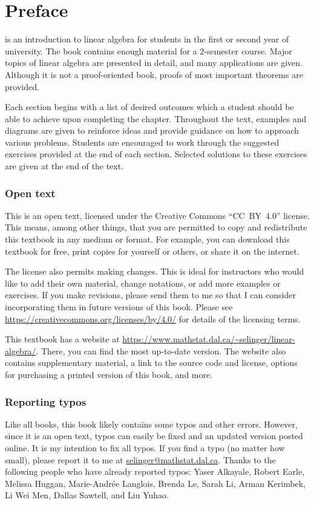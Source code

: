 \chapter*{Preface}

\textit{\bookfulltitle} is an introduction to linear algebra for
students in the first or second year of university. The book contains
enough material for a 2-semester course. Major topics of linear
algebra are presented in detail, and many applications are
given. Although it is not a proof-oriented book, proofs of most
important theorems are provided. 

Each section begins with a list of desired outcomes which a student
should be able to achieve upon completing the chapter.  Throughout the
text, examples and diagrams are given to reinforce ideas and provide
guidance on how to approach various problems. Students are encouraged
to work through the suggested exercises provided at the end of each
section. Selected solutions to these exercises are given at the end of
the text.

\subsection*{Open text}

This is an open text, licensed under the Creative Commons
``CC~BY~4.0'' license. This means, among other things, that you are
permitted to copy and redistribute this textbook in any medium or
format. For example, you can download this textbook for free, print
copies for yourself or others, or share it on the internet.

The license also permits making changes. This is ideal for instructors
who would like to add their own material, change notations, or add
more examples or exercises. If you make revisions, please send them to
me so that I can consider incorporating them in future versions of
this book. Please see
\url{https://creativecommons.org/licenses/by/4.0/} for details of the
licensing terms.

This textbook has a website at
\url{https://www.mathstat.dal.ca/~selinger/linear-algebra/}.  There,
you can find the most up-to-date version. The website also contains
supplementary material, a link to the source code and license, options
for purchasing a printed version of this book, and more.

\subsection*{Reporting typos}

Like all books, this book likely contains some typos and other
errors. However, since it is an open text, typos can easily be fixed
and an updated version posted online. It is my intention to fix all
typos. If you find a typo (no matter how small), please report it to
me at
\href{mailto:selinger@mathstat.dal.ca}{selinger@mathstat.dal.ca}. Thanks
to the following people who have already reported typos: Yaser
Alkayale, Robert Earle, Melissa Huggan, Marie-Andr\'ee Langlois,
Brenda Le, Sarah Li, Arman Kerimbek, Li Wei Men, Dallas Sawtell, and
Liu Yuhao.
